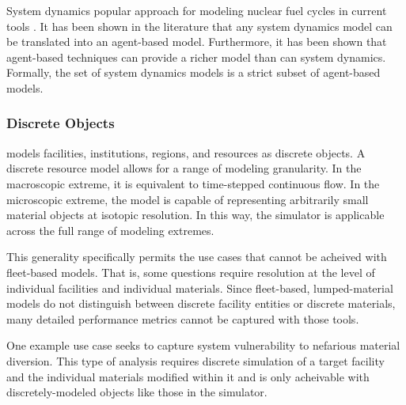 System dynamics popular approach for modeling nuclear fuel cycles in current
tools \cite{VISION,CAFCA}. It has been shown in the literature
\cite{macal_agent-based_2010} that any system dynamics model can be translated
into an agent-based model. Furthermore, it has been shown that agent-based
techniques can provide a richer model than can system dynamics. Formally, the
set of system dynamics models is a strict subset of agent-based models.



\subsubsection{Discrete Objects}

\Cyclus models facilities, institutions, regions, and resources as discrete 
objects. A discrete resource model allows for a range of modeling granularity. In the
macroscopic extreme, it is equivalent to time-stepped continuous flow. In the
microscopic extreme, the model is capable of representing arbitrarily small 
material objects at isotopic resolution. In this way, the \Cyclus simulator is 
applicable across the full range of modeling extremes. 

This generality specifically permits the use cases that cannot be acheived with 
fleet-based models. That is, some questions require resolution at the level of 
individual facilities and individual materials.  Since fleet-based, 
lumped-material models do not distinguish between discrete facility entities or 
discrete materials, many detailed performance metrics cannot be captured with 
those tools. 

One example use case seeks to capture system vulnerability to nefarious 
material diversion. This type of analysis requires discrete simulation of a 
target facility and the individual materials modified within it and is only 
acheivable with discretely-modeled objects like those in the \Cyclus simulator. 

